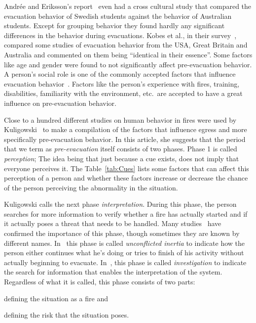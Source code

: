 Andr\'{e}e and Eriksson's report~\cite{Andree:2008td} even had a cross cultural study that compared the evacuation behavior of Swedish students against the behavior of Australian students. Except for grouping behavior they found hardly any significant differences in the behavior during evacuations. Kobes et al., in their survey~\cite{Kobes:2009jx}, compared some studies of evacuation behavior from the USA, Great Britain and Australia and commented on them being ``identical in their essence''. Some factors like age and gender were found to not significantly affect pre-evacuation behavior. A person's social role is one of the commonly accepted factors that influence evacuation behavior~\cite{Sandberg:1997tw,Kobes:2009jx,Paulsen:1984ti}. Factors like the person's experience with fires, training, disabilities, familiarity with the environment, etc.\ are accepted to have a great influence on pre-evacuation behavior.

Close to a hundred different studies on human behavior in fires were used by Kuligowski~\cite{Kuligowski:2009un} to make a compilation of the factors that influence egress and more specifically pre-evacuation behavior. In this article, she suggests that the period that we term as \emph{pre-evacuation} itself consists of two phases. Phase 1 is called \emph{perception}; The idea being that just because a cue exists, does not imply that everyone perceives it. The Table~\ref{tab:Cues} lists some factors that can affect this perception of a person and whether these factors increase or decrease the chance of the person perceiving the abnormality in the situation.

Kuligowski calls the next phase \emph{interpretation}. During this phase, the person searches for more information to verify whether a fire has actually started and if it actually poses a threat that needs to be handled. Many studies~\cite{Ozel:2001tn,Proulx:2007ul} have confirmed the importance of this phase, though sometimes they are known by different names. In~\cite{Ozel:2001tn} this phase is called \emph{unconflicted inertia} to indicate how the person either continues what he's doing or tries to finish of his activity without actually beginning to evacuate. In~\cite{Tong:1985wn}, this phase is called \emph{investigation} to indicate the search for information that enables the interpretation of the system. Regardless of what it is called, this phase consists of two parts:
\begin{inparaenum}
\item defining the situation as a fire and
\item defining the risk that the situation poses.
\end{inparaenum}


